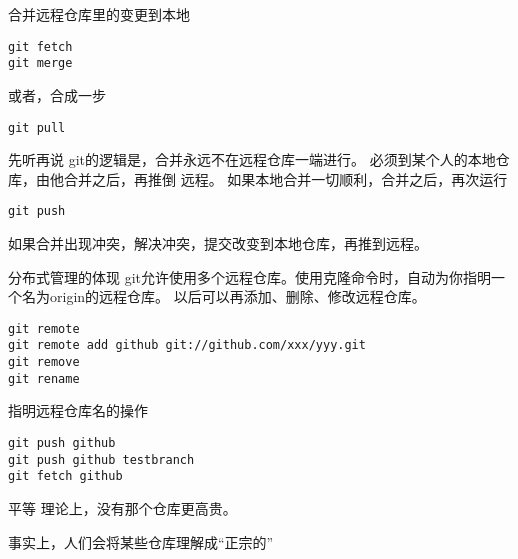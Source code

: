 \begin{frame}[<+->][fragile]{合并远程仓库里的变更到本地}
\begin{Verbatim}[frame=single,commandchars=\\\{\}]
git fetch
git merge
\end{Verbatim}

\onslide<+->
或者，合成一步
\begin{Verbatim}[frame=single,commandchars=\\\{\}]
git pull
\end{Verbatim}
\end{frame}

\begin{frame}[<+->][fragile]{先听再说}
\onslide<+->
git的逻辑是，合并永远不在远程仓库一端进行。
必须到某个人的本地仓库，由他合并之后，再推倒
远程。
\onslide<+->
如果本地合并一切顺利，合并之后，再次运行
\begin{Verbatim}[frame=single,commandchars=\\\{\}]
git push
\end{Verbatim}
\onslide<+->
如果合并出现冲突，解决冲突，提交改变到本地仓库，再推到远程。
\end{frame}

\begin{frame}[<+->][fragile]{分布式管理的体现}
\onslide<+->
git允许使用多个远程仓库。使用克隆命令时，自动为你指明一个名为origin的远程仓库。
以后可以再添加、删除、修改远程仓库。
\begin{Verbatim}[frame=single,commandchars=\\\{\}]
git remote 
git remote add github git://github.com/xxx/yyy.git
git remove
git rename
\end{Verbatim}

\onslide<+->
指明远程仓库名的操作
\begin{Verbatim}[frame=single,commandchars=\\\{\}]
git push github
git push github testbranch
git fetch github
\end{Verbatim}
\end{frame}

\begin{frame}[<+->][fragile]{平等}
\onslide<+->
理论上，没有那个仓库更高贵。

\onslide<+->
事实上，人们会将某些仓库理解成“正宗的”
\end{frame}
